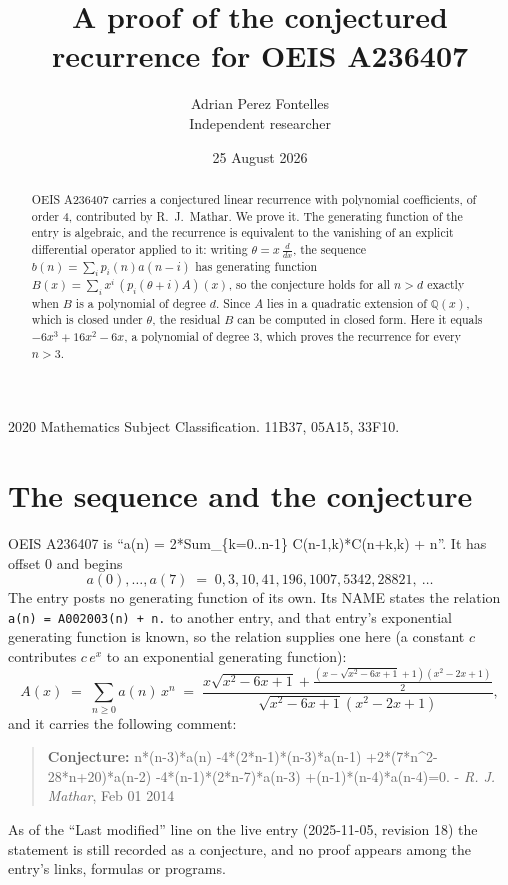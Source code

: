 \documentclass[11pt,a4paper]{article}
\title{A proof of the conjectured recurrence for OEIS A236407}
\author{Adrian Perez Fontelles\\ \small Independent researcher}
\date{25 August 2026}
\theoremstyle{plain}
\theoremstyle{definition}
\begin{document}
\maketitle

\begin{abstract}
OEIS A236407 carries a conjectured linear recurrence with polynomial coefficients, of
order 4, contributed by R.~J.~Mathar. We prove it. The generating function of the
entry is algebraic, and the recurrence is equivalent to the vanishing of an explicit
differential operator applied to it: writing $\theta=x\,\frac{d}{dx}$, the sequence
$b(n)=\sum_{i}p_{i}(n)a(n-i)$ has generating function
$B(x)=\sum_{i}x^{i}\,(p_{i}(\theta+i)A)(x)$, so the conjecture holds for all $n>d$ exactly
when $B$ is a polynomial of degree $d$. Since $A$ lies in a quadratic extension of
$\mathbb{Q}(x)$, which is closed under $\theta$, the residual $B$ can be computed in
closed form. Here it equals $- 6 x^{3} + 16 x^{2} - 6 x$, a polynomial of degree $3$, which proves
the recurrence for every $n>3$.
\end{abstract}

\noindent\small 2020 Mathematics Subject Classification. 11B37, 05A15, 33F10.\normalsize

\section{The sequence and the conjecture}

OEIS A236407 is ``a(n) = 2*Sum\_\{k=0..n-1\} C(n-1,k)*C(n+k,k) + n''. It has offset $0$ and begins
\[
a(0),\dots,a(7)\;=\;0, 3, 10, 41, 196, 1007, 5342, 28821,\ \dots
\]
The entry posts no generating function of its own. Its NAME states the
relation \texttt{a(n) = A002003(n) + n.} to another entry, and that entry's exponential generating
function is known, so the relation supplies one here (a constant $c$ contributes
$c\,e^{x}$ to an exponential generating function):
\begin{equation}\label{eq:gf}
A(x)\;=\;\sum_{n\ge 0} a(n)\,x^{n}\;=\;\frac{x \sqrt{x^{2} - 6 x + 1} + \frac{\left(x - \sqrt{x^{2} - 6 x + 1} + 1\right) \left(x^{2} - 2 x + 1\right)}{2}}{\sqrt{x^{2} - 6 x + 1} \left(x^{2} - 2 x + 1\right)} ,
\end{equation}
and it carries the following comment:
\begin{quote}\small
\textbf{Conjecture:} n*(n-3)*a(n) -4*(2*n-1)*(n-3)*a(n-1) +2*(7*n\^{}2-28*n+20)*a(n-2) -4*(n-1)*(2*n-7)*a(n-3) +(n-1)*(n-4)*a(n-4)=0. - \emph{R. J. Mathar}, Feb 01 2014
\end{quote}
As of the ``Last modified'' line on the live entry (2025-11-05, revision 18) the
statement is still recorded as a conjecture, and no proof appears among the entry's links,
formulas or programs.
\end{document}
